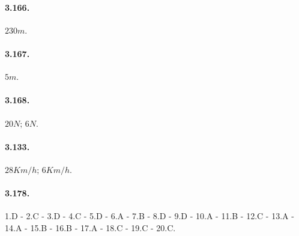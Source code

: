 \begin{multicols}{3}
\paragraph{3.166.}$ 230\unit{m} $.

\paragraph{3.167.}$ 5\unit{m} $.

\paragraph{3.168.}$ 20\unit{N};\, 6\unit{N} $.

\paragraph{3.133.}$ 28\unit{Km/h};\, 6\unit{Km/h} $.

\end{multicols}

\paragraph{3.178.} 1.D - 2.C - 3.D - 4.C - 5.D - 6.A - 7.B - 8.D - 9.D - 10.A - 11.B - 12.C - 13.A - 14.A - 15.B - 16.B - 17.A - 18.C - 19.C - 20.C.